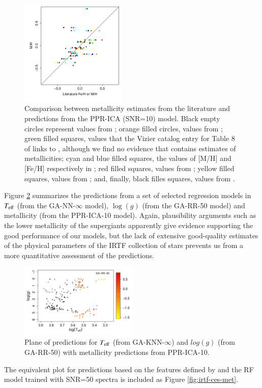  \begin{figure}
 \centering
 \includegraphics[width=0.45\textwidth]{figs/irtf-figs/M-ICA10.pdf}

\caption{Comparison
  between metallicity estimates from the literature and predictions
  from the PPR-ICA (SNR=10) model.  Black empty circles represent
  values from \protect\cite{cesetti} ; orange filled circles, values
  from \protect\cite{NevesIII}; green filled squares, values that the
  Vizier catalog entry for Table 8 of \protect\cite{NevesIII} links
  to \protect\cite{Jao}, although we find no evidence
  that \protect\cite{Jao} contains estimates of metallicities; cyan
  and blue filled squares, the values of [M/H] and [Fe/H] respectively
  in \protect\cite{RA2012}; red filled squares, values
  from \protect\cite{Mann2015}; yellow filled squares, values
  from \protect\cite{Newton2014}; and, finally, black filles squares, values
  from \protect\cite{Gaidos2015}.}

\label{MIRTF_ICA_10}
\end {figure}

Figure \ref{fig:irtf-teff-logg-met} summarizes the predictions from a
set of selected regression models in $T_{\rm eff}$ (from the
GA-NN-$\infty$ model), $\log(g)$ (from the GA-RR-50 model) and
metallicity (from the PPR-ICA-10 model). Again, plausibility arguments
such as the lower metallicity of the supergiants apparently give
evidence supporting the good performance of our models, but the lack
of extensive good-quality estimates of the physical parameters of the
IRTF collection of stars prevents us from a more quantitative
assessment of the predictions.

 \begin{figure}
 \centering
 \includegraphics[width=0.5\textwidth]{figs/ordieres-fig8.pdf}
\caption{Plane of predictions for $T_{\rm eff}$ (from GA-KNN-$\infty$)
and $log(g)$ (from GA-RR-50) with metallicity predictions from
PPR-ICA-10.}
\label{fig:irtf-teff-logg-met}
\end {figure}

The equivalent plot for predictions based on the features defined
by \cite{cesetti} and the RF model trained with SNR=50 spectra is
included as Figure \ref{fig:irtf-ces-met}.


